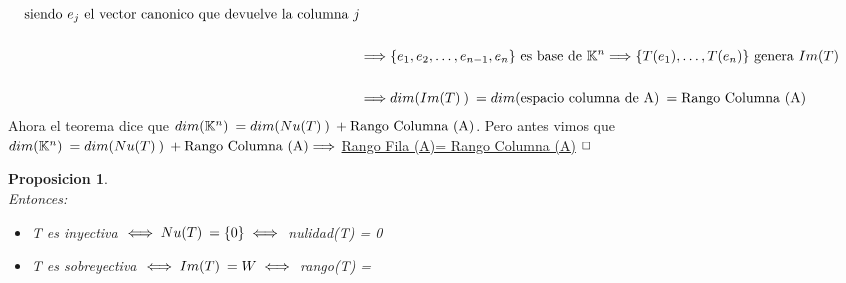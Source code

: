 \documentclass[]{article}
\newtheorem{proposition}{Proposicion}[theorem]
\newenvironment{proof}{\noindent{\bf Prueba:}}{$\hfill \Box$ \vspace{10pt}}
\newcommand{\K}{
    \mathbb{K}
}
\newcommand{\ida}{\Longrightarrow}
\begin{document}
\begin{proof}
\begin{align*}
        \text{ siendo $e_j$ el vector canonico que devuelve la columna $j$}\\
        \\
        &\ida \conjunto{e_1,e_2,\dots,e_{n-1},e_n} \text{ es base de } \K^n
        \ida \conjunto{\T{e_1},\dots,\T{e_n}} \text{ genera }\I\\
        \\
        &\ida \dm{\I}=\dm{\text{espacio columna de A}}=\text{Rango Columna (A)}
    \end{align*}
    Ahora el teorema dice que $\dm{\K^n}=\dm{\N}+\text{Rango Columna (A)}$. Pero antes vimos que
    $\dm{\K^n}=\dm{\N}+\text{Rango Columna (A)} \ida$ \underline{Rango Fila (A)= Rango Columna (A)}
\end{proof}
\begin{proposition}
    \\
    Entonces:
    \begin{itemize}
        \item T es inyectiva $\iff \text{$Nu(T)$}\: = \text{$\{ {0} \}$} \iff$ nulidad(T) = 0
        \item T es sobreyectiva $\iff \text{$Im(T)$}\: = W \iff$ rango(T) = 
    \end{itemize}
\end{proposition}
\end{document}

